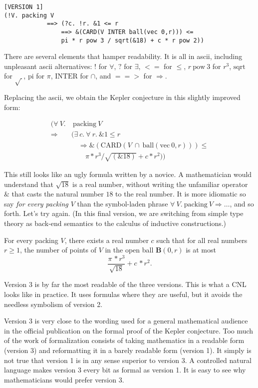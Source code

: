 \documentclass[12pt]{amsart}
\newcommand{\h}[1]{\text{#1}}
\renewcommand{\~}{\ }
\renewcommand{\_}{\textunderscore}
\begin{document}
\begin{verbatim}[VERSION 1]
(!V. packing V
            ==> (?c. !r. &1 <= r
                ==> &(CARD(V INTER ball(vec 0,r))) <=
                pi * r pow 3 / sqrt(&18) + c * r pow 2))
\end{verbatim}

There are several elements that hamper readability.
It is all in ascii, including unpleasant
ascii alternatives: $!$ for $\forall$, $?$ for $\exists$,
$<=$ for $\le$, $r\ \h{pow}\ 3$ for $r^3$, $\h{sqrt}$ for
$\sqrt{\ }$, $\h{pi}$ for $\pi$,
$\h{INTER}$ for $\cap$, and $==>$ for $\Rightarrow$.

Replacing the ascii, we obtain the Kepler conjecture in this
slightly improved form:

\noindent [VERSION 2]
\begin{align*}
(\forall\ V.&\ \h{packing}\ V
\\ \Rightarrow& (\exists\ c.\ \forall\ r.\ \&1 \le r
\\ &\quad \Rightarrow
 \&(\h{CARD}(V\ \cap\ \h{ball}(\h{vec}\ 0,r))) \le
\\&\quad\quad \pi * r^3 / \sqrt{(\&18)} + c * r^2))
\end{align*}

This still looks like an ugly formula written by a novice.  A
mathematician would understand that $\sqrt{18}$ is a real number,
without writing the unfamiliar operator $\&$ that casts the natural number $18$
to the real number.  It is more idiomatic so say {\it for every
  packing $V$} than the symbol-laden phrase
$\forall\ V.\ \h{packing}\ V\Rightarrow\ldots$, and so forth. Let's
try again. (In this final version, we are switching from
simple type theory as back-end
semantics to the calculus of inductive constructions.)

\noindent[VERSION 3]

For every packing $V$, there exists a real number $c$
such that for all real numbers $r\ge1$,
the number of points of $V$ in the open ball ${\mathbf B}(0,r)$ is at most
\[
\frac{\pi\,* r^3}{\sqrt{18}} + c\,* r^2.
\]
\bigskip

Version 3 is by far the most readable of the three versions.
This is what a CNL looks like in practice.
It uses formulas where they are useful, but it
avoids the needless symbolism of version 2. 

Version 3 is very close to the wording used for a general mathematical
audience in the official publication on the formal proof of the Kepler
conjecture.  Too much of the work of formalization consists of
taking mathematics in a readable form (version 3) and reformatting
it in a barely readable form (version 1).  It simply is not true
that version 1 is in any sense superior to version 3.  A controlled
natural language makes version 3 every bit as formal as version 1.
It is easy to see why mathematicians would prefer version 3.
\end{document}
